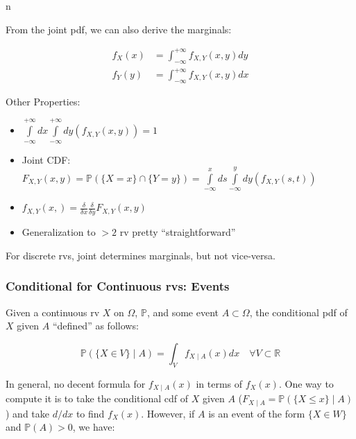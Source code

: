 n\documentclass{article}
\begin{document}
From the joint pdf, we can also derive the marginals:

\begin{equation}
  \tag{Joint pdf Marginals}
  \boxed{
    \begin{split}
      f_X(x) &= \int_{-\infty}^{+\infty} f_{X,Y}(x,y) dy \\
      f_Y(y) &= \int_{-\infty}^{+\infty} f_{X,Y}(x,y) dx
    \end{split}
  }
\end{equation}

Other Properties:

\begin{itemize}
\item $\int\limits_{-\infty}^{+\infty} dx
  \int\limits_{-\infty}^{+\infty} dy (f_{X,Y}(x,y)) = 1$

\item Joint CDF: $F_{X,Y}(x,y) = \mathbb{P}(\{X=x\} \cap \{Y=y\}) =
  \int\limits_{-\infty}^{x} ds \int\limits_{-\infty}^{y} dy
  (f_{X,Y}(s,t))$

\item $f_{X,Y}(x,) = \frac{\delta}{\delta x} \frac{\delta}{\delta y}
  F_{X,Y}(x,y)$

\item Generalization to $> 2$ rv pretty ``straightforward''
\end{itemize}

For discrete rvs, joint determines marginals, but not vice-versa.

\subsubsection{Conditional for Continuous rvs: Events}

Given a continuous rv $X$ on $\Omega$, $\mathbb{P}$, and some event
$A\subset\Omega$, the conditional pdf of $X$ given $A$ ``defined'' as
follows:

\begin{equation}
  \tag{Conditional pdf: Event}
  \boxed{
    \mathbb{P}(\{X\in V\}\mid A) = \int_V f_{X\mid A}(x) dx \quad
    \forall V \subset \mathbb{R}
  }
\end{equation}

In general, no decent formula for $f_{X\mid A}(x)$ in terms of
$f_X(x)$. One way to compute it is to take the conditional cdf of $X$
given $A$ ($F_{X\mid A} = \mathbb{P}(\{X \leq x\} \mid A)$) and take
$d/dx$ to find $f_X(x)$. However, if $A$ is an event of the form $\{X
\in W\}$ and $\mathbb{P}(A)>0$, we have:
\end{document}
